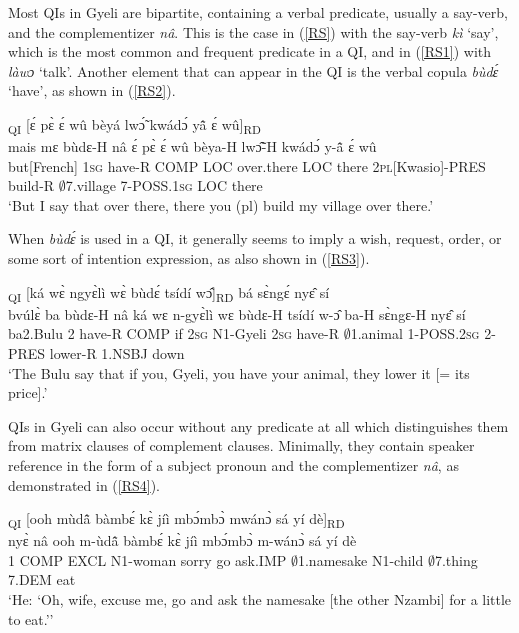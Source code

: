 Most QIs in Gyeli are bipartite, containing a verbal predicate, usually a say-verb, and the complementizer {\itshape nâ}. This is the case in (\ref{RS}) with the say-verb {\itshape kì} `say', which is the most common and frequent predicate in a QI, and in (\ref{RS1}) with {\itshape làwɔ} `talk'. Another element that can appear in the QI is the verbal copula {\itshape bùdɛ́} `have', as shown in (\ref{RS2}).

\begin{exe} 
\ex\label{RS2} 
  \glll  [mais mɛ̀ bùdɛ́ nâ]\textsubscript{QI} [ɛ́ pɛ̀ ɛ́ wû bèyá lwɔ̃́ kwádɔ́ yã̂ ɛ́ wû]\textsubscript{RD} \\
       mais mɛ bùdɛ-H nâ ɛ́ pɛ̀ ɛ́ wû bèya-H lwɔ̃̂-H kwádɔ́ y-ã̂ ɛ́ wû\\
         but[French] 1\textsc{sg} have-R COMP LOC over.there LOC there 2\textsc{pl}[Kwasio]-PRES build-R $\emptyset$7.village 7-POSS.1\textsc{sg} LOC there\\
    \trans `But I say that over there, there you (pl) build my village over there.'
\end{exe}

When {\itshape bùdɛ́} is used in a QI, it generally seems to imply a wish, request, order, or some sort of intention expression, as also shown in (\ref{RS3}).

\begin{exe} 
\ex\label{RS3}
  \glll [bvúlɛ̀ bà bùdɛ́ nâ]\textsubscript{QI} [ká wɛ̀ ngyɛ̀lì wɛ̀ bùdɛ́ tsídí wɔ̂]\textsubscript{RD} bá sɛ̀ngɛ́ nyɛ̂ sí \\
        bvúlɛ̀ ba bùdɛ-H nâ ká wɛ n-gyɛ̀lì wɛ bùdɛ-H tsídí w-ɔ̂ ba-H sɛ̀ngɛ-H nyɛ̂ sí \\
          ba2.Bulu 2 have-R COMP if 2\textsc{sg} N1-Gyeli 2\textsc{sg} have-R $\emptyset$1.animal 1-POSS.2\textsc{sg} 2-PRES lower-R 1.NSBJ down   \\
    \trans `The Bulu say that if you, Gyeli, you have your animal, they lower it [= its price].'
\end{exe}

QIs in Gyeli can also occur without any predicate at all which distinguishes them from matrix clauses of complement clauses. Minimally, they contain speaker reference in the form of a subject pronoun and the complementizer {\itshape nâ}, as demonstrated in (\ref{RS4}).

\begin{exe}
\ex\label{RS4}
  \glll  [nyɛ̀ nâ]\textsubscript{QI} [ooh mùdã̂ bàmbɛ́ kɛ̀ jíì mbɔ́mbɔ̀ mwánɔ̀ sá yí dè]\textsubscript{RD} \\
         nyɛ̀ nâ ooh m-ùdã̂ bàmbɛ́ kɛ̀ jíì mbɔ́mbɔ̀ m-wánɔ̀ sá yí dè \\
        1 COMP EXCL N1-woman sorry go ask.IMP $\emptyset$1.namesake N1-child $\emptyset$7.thing 7.DEM eat  \\ 
    \trans `He: `Oh, wife, excuse me, go and ask the namesake [the other Nzambi] for a little to eat.''
\end{exe}

